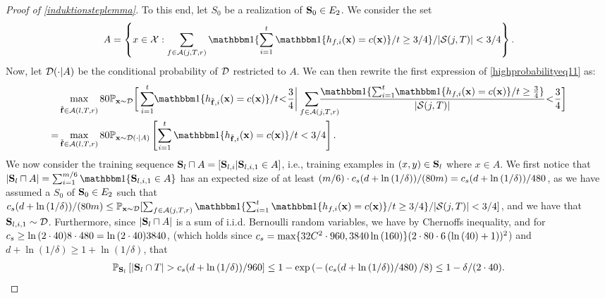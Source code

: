 \begin{proof}[Proof of \cref{induktionsteplemma}]
To this end, let $ S_{0} $ be a realization of $ \mathbf{S}_{0} \in E_{2}$. We consider the set $$A=\left\{x\in\cX:\sum_{f\in \cA(j,T,r)} \ind\{\sum_{i=1}^{t} \ind\{h_{f,i}(\rx)=c(\rx)\}/t\geq 3/4\}/|\cS(j,T)|<3/4\right\}.$$ Now, let $\mathcal{D}(\cdot | A)$ be the conditional probability of $\mathcal{D}$ restricted to $A$. We can then rewrite the first expression of \cref{highprobabilityeq11} as:
\begin{align}\label{highprobabilityeq13}
  \negmedspace\negmedspace\negmedspace\negmedspace
  &\max_{\stackrel{}{\rf\in\cA(l,T,r)}} 80\p_{\rx\sim \cD}
  \bigg[ \sum_{i=1}^{t}\negmedspace  \ind\{h_{\rf,i}(\rx)=c(\rx)\}/t\negmedspace <\negmedspace \frac{3}{4}\bigg |
   \negmedspace  \negmedspace \negmedspace  \negmedspace \negmedspace \negmedspace \negmedspace\sum_{\text{\quad\quad}f\in \cA(j,T,r)} \negmedspace \negmedspace \negmedspace \negmedspace\negmedspace \negmedspace  \negmedspace \negmedspace \negmedspace \negmedspace \frac{\ind\{\sum_{i=1}^{t}\negmedspace  \ind\{h_{f,i}(\rx)=c(\rx)\}/t\geq \frac{3}{4}\}}{|\cS(j,T)|}
   \negmedspace<\negmedspace\frac{3}{4}\bigg]\nonumber
  \\
  =
  &\max_{\rf\in \cA(l,T,r)} 80\p_{\rx\sim \cD(\cdot| A)}
  \left[
  \sum_{i=1}^{t} \ind\{h_{\rf,i}(\rx)=c(\rx)\}/t< 3/4
 \right]. 
\end{align}
We now consider the training sequence $\mathbf{S}_{l}\sqcap A=[\mathbf{S}_{l,i}| \mathbf{S}_{l,i,1}\in A]$, i.e., training examples in $(x,y)\in\mathbf{S}_{l}$ where $x\in A$. We first notice that $|\rS_{l}\sqcap A|=\sum_{i=1}^{m/6} \ind\{{\rS_{l,i,1}}\in A\}$ has an expected size of at least $(m/6)\cdot c_s(d+\ln{\left(1/\delta \right)})/(80m)=c_s(d+\ln{\left(1/\delta \right)})/480$, as we have assumed a  $ S_0 $  of $\mathbf{S}_0\in E_{2}$ such that $\cs(d+\ln{\left(1/\delta \right)})/(80m)\leq \p_{\rx\sim \cD}[\sum_{f\in \cA(j,T,r)} \ind\{\sum_{i=1}^{t} \ind\{h_{f,i}(\rx)=c(\rx)\}/t\geq 3/4\}/|\cS(j,T)|<3/4]$, and we have that $ \mathbf{S}_{l,i,1}\sim \mathcal{D} $. Furthermore, since $ |\mathbf{S}_{l}\sqcap A| $  is a sum of i.i.d. Bernoulli random variables, we have by Chernoffs inequality, and for  $c_s\geq\ln{\left(2\cdot40\right)}8\cdot480=\ln{(2\cdot40)}3840$, (which holds since $c_s= \max\{32C^{2}\cdot 960,3840\ln{\left(160 \right)}\}(2\cdot 80\cdot 6 \left(\ln{\left(40 \right)}+1\right))^2$) and $d+\ln{\left(1/\delta \right)}\geq1+ \ln{\left(1/\delta \right)}$,  that
\begin{align*}
  \p_{\rS_{l}}\left[|\rS_{l}\cap T|> \cs(d+\ln{\left(1/\delta \right)})/960\right]\leq 1-\exp\left(-\left(\cs(d+\ln{\left(1/\delta \right)})/480\right)/8\right)\leq1- \delta/(2\cdot\cff).

\end{align*}
\end{proof}

